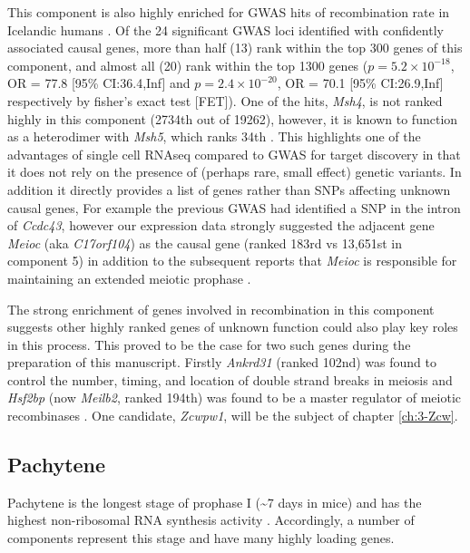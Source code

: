 This component is also highly enriched for GWAS hits of recombination rate in Icelandic humans \parencite{Halldorsson2019Characterizing}. Of the 24 significant GWAS loci identified with confidently associated causal genes, more than half (13) rank within the top 300 genes of this component, and almost all (20) rank within the top 1300 genes ($p = 5.2\times10^{-18}$, OR = 77.8 [95\% CI:36.4,Inf] and $p = 2.4\times10^{-20}$, OR = 70.1 [95\% CI:26.9,Inf] respectively by fisher's exact test [FET]). One of the hits, \textit{Msh4}, is not ranked highly in this component (2734th out of 19262), however, it is known to function as a heterodimer with \textit{Msh5}, which ranks 34th \parencite{Rakshambikai2013Structural}. This highlights one of the advantages of single cell RNAseq compared to GWAS for target discovery in that it does not rely on the presence of (perhaps rare, small effect) genetic variants. In addition it directly provides a list of genes rather than SNPs affecting unknown causal genes, For example the previous GWAS had identified a SNP in the intron of \textit{Ccdc43}, however our expression data strongly suggested the adjacent gene \textit{Meioc} (aka \textit{C17orf104}) as the causal gene (ranked 183rd vs 13,651st in component 5) in addition to the subsequent reports that \textit{Meioc} is responsible for maintaining an extended meiotic prophase \parencite{Abby2016Implementation, Kong2014Common, Soh2017Meioc}. 

The strong enrichment of genes involved in recombination in this component suggests other highly ranked genes of unknown function could also play key roles in this process. This proved to be the case for two such genes during the preparation of this manuscript. Firstly \textit{Ankrd31} (ranked 102nd) was found to control the number, timing, and location of double strand breaks in meiosis \parencite{Boekhout2018REC114, Papanikos2018ANKRD31} and \textit{Hsf2bp} (now \textit{Meilb2}, ranked 194th) was found to be a master regulator of meiotic recombinases \parencite{Zhang2019meiosisspecific}. One candidate, \textit{Zcwpw1}, will be the subject of chapter \ref{ch:3-Zcw}.


\subsection{Pachytene}

Pachytene is the longest stage of prophase I (\textasciitilde7 days in mice) and has the highest non-ribosomal RNA synthesis activity \parencite{Monesi1978Chapter}. Accordingly, a number of components represent this stage and have many highly loading genes.

